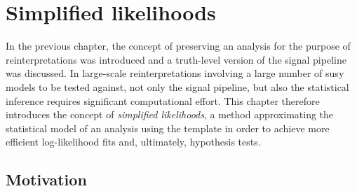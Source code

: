 


\chapter{Simplified likelihoods}\label{ch:simplify}

\graphicspath{{chapter-simplify/Figs/Vector/}{chapter-simplify/Figs/}}

In the previous chapter, the concept of preserving an analysis for the purpose of reinterpretations was introduced and a truth-level version of the signal pipeline was discussed. In large-scale reinterpretations involving a large number of \gls{susy} models to be tested against, not only the signal pipeline, but also the statistical inference requires significant computational effort. 
This chapter therefore introduces the concept of \textit{simplified likelihoods}, a method approximating the statistical model of an analysis using the  template in order to achieve more efficient log-likelihood fits and, ultimately, hypothesis tests.

\section{Motivation}\label{sec:simplified_likelihood_motivation}

